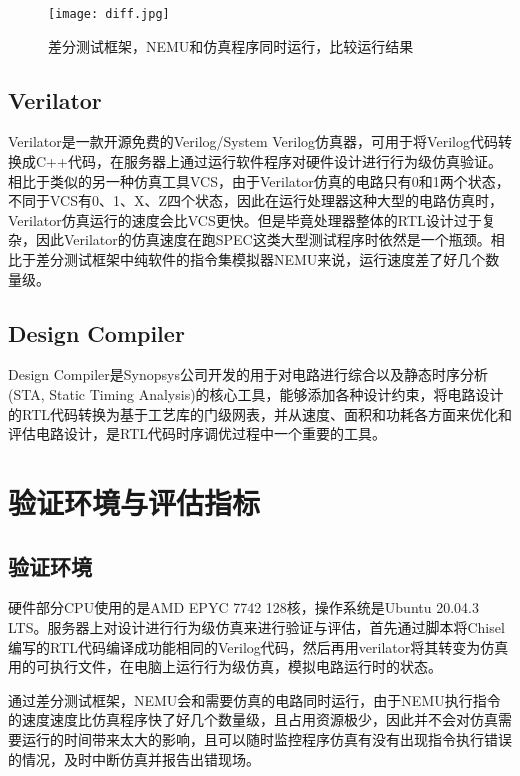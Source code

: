 \begin{figure}[htb]
	\centering
	\setlength\tabcolsep{3pt}  %
	\vspace{5pt} %
	\texttt{[image: diff.jpg]}
	\caption{差分测试框架，NEMU和仿真程序同时运行，比较运行结果}
	\label{fig:figure64}
\end{figure}

\subsection{Verilator}

Verilator\cite{verilator}是一款开源免费的Verilog/System Verilog仿真器，可用于将Verilog代码转换成C++代码，在服务器上通过运行软件程序对硬件设计进行行为级仿真验证。相比于类似的另一种仿真工具VCS\cite{vcs}，由于Verilator仿真的电路只有0和1两个状态，不同于VCS有0、1、X、Z四个状态，因此在运行处理器这种大型的电路仿真时，Verilator仿真运行的速度会比VCS更快。但是毕竟处理器整体的RTL设计过于复杂，因此Verilator的仿真速度在跑SPEC这类大型测试程序时依然是一个瓶颈。相比于差分测试框架中纯软件的指令集模拟器NEMU来说，运行速度差了好几个数量级。

\subsection{Design Compiler}

Design Compiler是Synopsys公司开发的用于对电路进行综合以及静态时序分析 (STA, Static Timing Analysis)的核心工具，能够添加各种设计约束，将电路设计的RTL代码转换为基于工艺库的门级网表，并从速度、面积和功耗各方面来优化和评估电路设计，是RTL代码时序调优过程中一个重要的工具。

\section{验证环境与评估指标}

\subsection{验证环境}

硬件部分CPU使用的是AMD EPYC 7742 128核，操作系统是Ubuntu 20.04.3 LTS。服务器上对设计进行行为级仿真来进行验证与评估，首先通过脚本将Chisel编写的RTL代码编译成功能相同的Verilog代码，然后再用verilator将其转变为仿真用的可执行文件，在电脑上运行行为级仿真，模拟电路运行时的状态。

通过差分测试框架，NEMU会和需要仿真的电路同时运行，由于NEMU执行指令的速度速度比仿真程序快了好几个数量级，且占用资源极少，因此并不会对仿真需要运行的时间带来太大的影响，且可以随时监控程序仿真有没有出现指令执行错误的情况，及时中断仿真并报告出错现场。

